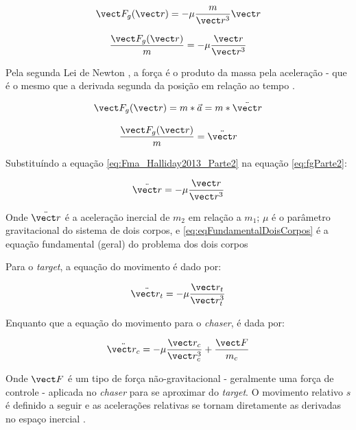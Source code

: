 \begin{equation}
\label{eq:fgParte1}
\vect F_g(\vect r) = -\mu \frac{m}{\vect r ^{3}} \vect r
\end{equation}

\begin{equation}
\label{eq:fgParte2}
\frac{\vect F_g(\vect r)}{m} = -\mu \frac{\vect r}{\vect r ^{3}}
\end{equation}

Pela segunda Lei de Newton \cite{newton1713}, a força é o produto da massa pela aceleração \cite{halliday2013} - que é o mesmo que a derivada segunda da posição em relação ao tempo \cite{edelstein2018_derivadaSegunda}.

\begin{equation}
\label{eq:F=ma_Halliday2013Parte1}
\vect F_g(\vect r) = m * \vec a = m * \ddot{\vect r}
\end{equation}

\begin{equation}
\label{eq:Fma_Halliday2013_Parte2}
\frac{\vect F_g(\vect r)}{m} = \ddot{\vect r}
\end{equation}

Substituíndo a equação \eqref{eq:Fma_Halliday2013_Parte2} na equação \eqref{eq:fgParte2}:

\begin{equation}
\label{eq:eqFundamentalDoisCorpos}
\ddot{\vect r} = -\mu \frac{\vect r}{\vect r ^{3}}
\end{equation}

Onde $\ddot{\vect r}$ é a aceleração inercial de $m_2$ em relação a $m_1$; $\mu$ é o parâmetro gravitacional do sistema de dois corpos, e \eqref{eq:eqFundamentalDoisCorpos} é a equação fundamental (geral) do problema dos dois corpos \cite{fehse2003,wie2008space}

Para o \emph{target}, a equação do movimento é dado por:

\begin{equation}
\label{eq:movimentoTarget}
\ddot{\vect r_t} = -\mu \frac{\vect r_t}{\vect r_t ^{3}}
\end{equation}

Enquanto que a equação do movimento para o \emph{chaser}, é dada por:

\begin{equation}
\label{eq:movimentoChaser}
\ddot{\vect r_c} = -\mu \frac{\vect r_c}{\vect r_c ^{3}} + \frac{\vect F}{m_c}
\end{equation}

Onde $\vect F$ é um tipo de força não-gravitacional - geralmente uma força de controle - aplicada no \emph{chaser} para se aproximar do \emph{target}. O movimento relativo $s$ é definido a seguir e as acelerações relativas se tornam diretamente as derivadas no espaço inercial \cite{fehse2003}.

